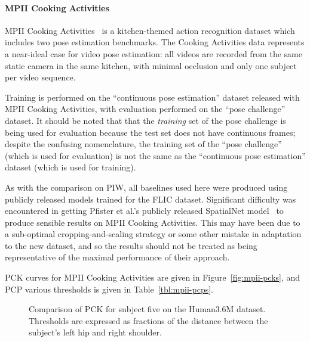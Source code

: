 \documentclass[runningheads]{llncs}
\begin{document}
\paragraph{MPII Cooking Activities} MPII Cooking
Activities~\cite{rohrbach2012database} is a kitchen-themed action recognition
dataset which includes two pose estimation benchmarks. The Cooking Activities
data represents a near-ideal case for video pose estimation: all videos are
recorded from the same static camera in the same kitchen, with minimal occlusion
and only one subject per video sequence.

Training is performed on the ``continuous pose estimation'' dataset released
with MPII Cooking Activities, with evaluation performed on the ``pose
challenge'' dataset. It should be noted that that the \textit{training} set of
the pose challenge is being used for evaluation because the test set does not
have continuous frames; despite the confusing nomenclature, the training set of
the ``pose challenge'' (which is used for evaluation) is not the same as the
``continuous pose estimation'' dataset (which is used for training).

As with the comparison on PIW, all baselines used here were produced using
publicly released models trained for the FLIC dataset. Significant difficulty
was encountered in getting Pfister et al.'s publicly released SpatialNet
model~\cite{pfister2015flowing} to produce sensible results on MPII Cooking
Activities. This may have been due to a sub-optimal cropping-and-scaling
strategy or some other mistake in adaptation to the new dataset, and so the
results should not be treated as being representative of the maximal performance
of their approach.

PCK curves for MPII Cooking Activities are given in Figure~\ref{fig:mpii-pcks},
and PCP various thresholds is given in Table~\ref{tbl:mpii-pcps}.

\begin{figure}[t]
\begin{center}

\end{center}
\vspace{-8mm}
\caption{Comparison of PCK for subject five on the Human3.6M dataset. Thresholds
are expressed as fractions of the distance between the subject's left hip and
right shoulder.}
\label{fig:h36m-pck}
\end{figure}
\end{document}
